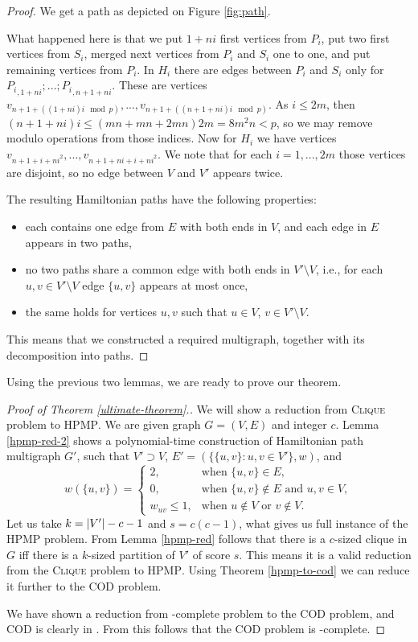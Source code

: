 \begin{proof}
We get a path as depicted on Figure \ref{fig:path}.

What happened here is that we put $1+ni$ first vertices from $P_i$,
put two first vertices from $S_i$, merged next vertices from $P_i$ and $S_i$ one to one,
and put remaining vertices from $P_i$.
In $H_i$ there are edges between $P_i$ and $S_i$ only for ${P_i}_{,1+ni}; ...; {P_i}_{,n+1+ni}$.
These are vertices $v_{n+1+((1+ni)i \mod p)}, ..., v_{n+1+((n+1+ni)i \mod p)} $.
As $i \leq 2m$, then $(n+1+ni)i \leq (mn+mn+2mn)2m = 8m^2 n < p$,
so we may remove modulo operations from those indices.
Now for $H_i$ we have vertices $v_{n+1+i+ni^2}, ..., v_{n+1+ni+i+ni^2}$.
We note that for each $i=1,...,2m$ those vertices are disjoint, so no edge between $V$ and $V'$ appears twice.

The resulting Hamiltonian paths have the following properties:
\begin{itemize}
\item each contains one edge from $E$ with both ends in $V$,
  and each edge in $E$ appears in two paths,
\item no two paths share a common edge with both ends in $V' \setminus V$,
  i.e., for each $u,v \in V' \setminus V$ edge $\{u,v\}$ appears at most once,
\item the same holds for vertices $u,v$ such that $u \in V$, $v \in V' \setminus V$.
\end{itemize}
This means that we constructed a required multigraph, together with its decomposition into paths.
\end{proof}

Using the previous two lemmas, we are ready to prove our theorem.

\begin{proof}[Proof of Theorem \ref{ultimate-theorem}.]
We will show a reduction from \textsc{Clique} problem to \textsc{HPMP}.
We are given graph $G = (V, E)$ and integer $c$.
Lemma \ref{hpmp-red-2} shows a polynomial-time construction of Hamiltonian path multigraph $G'$,
such that $V' \supset V$, $E'=(\{\{u,v\}: u,v \in V'\}, w)$, and
$$ w(\{u,v\}) =
\begin{cases}
2, 				&\text{when } \{u,v\} \in E ,\\
0, 				&\text{when } \{u,v\} \not\in E \text{ and } u,v \in V ,\\
w_{u v}\leq 1,	&\text{when } u \not\in V \text{ or } v \not\in V.
\end{cases}
$$
Let us take $k=\left\vert V' \right\vert-c-1$ and $s=c(c-1)$, what gives us full instance of the \textsc{HPMP} problem.
From Lemma \ref{hpmp-red} follows that there is a $c$-sized clique in $G$
iff there is a $k$-sized partition of $V'$ of score $s$.
This means it is a valid reduction from the \textsc{Clique} problem to \textsc{HPMP}.
Using Theorem \ref{hpmp-to-cod} we can reduce it further to the \textsc{COD} problem.

We have shown a reduction from \np-complete problem to the \textsc{COD} problem,
and \textsc{COD} is clearly in \np.
From this follows that the \textsc{COD} problem is \np-complete.
\end{proof}


